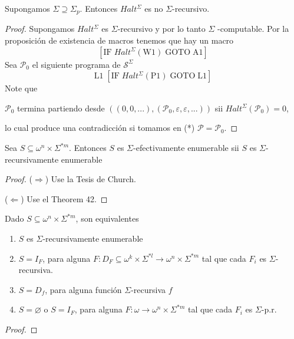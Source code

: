   \begin{lemma}
    Supongamos \(\Sigma \supseteq \Sigma _{p}\). Entonces \( Halt^{\Sigma }\) es no \(\Sigma \)-recursivo.
  \begin{proof}
    Supongamos \(Halt^{\Sigma }\) es \(\Sigma \)-recursivo y por lo tanto \(\Sigma \) -computable. 
    Por la proposición de existencia de macros tenemos que hay un macro
    \[
      \displaystyle \left[ \mathrm{IF}\;Halt^{\Sigma }(\mathrm{W}1)\;\mathrm{GOTO}\;\mathrm{A}1 \right]
    \]
    Sea \(\mathcal{P}_{0}\) el siguiente programa de \(\mathcal{S}^{\Sigma }\)
    \[
      \displaystyle \mathrm{L}1\;\left[ \mathrm{IF}\;Halt^{\Sigma }(\mathrm{P}1)\;\mathrm{GOTO}\; \mathrm{L}1\right]
    \]
    Note que
    
    \(\mathcal{P}_{0}\) termina partiendo desde \(\left( (0,0,...),( \mathcal{P}_{0},\varepsilon ,\varepsilon ,...)
    \right) \) sii \(Halt^{\Sigma }( \mathcal{P}_{0})=0\),

    \noindent lo cual produce una contradicción si tomamos en (*) \(\mathcal{P}= \mathcal{P}_{0}\).
  \end{proof}
  \end{lemma}


  \begin{theorem}
    Sea \(S\subseteq \omega ^{n}\times \Sigma ^{\ast m}\). Entonces \(S\) es \(\Sigma \)-efectivamente enumerable 
    sii \(S\) es \(\Sigma \)-recursivamente enumerable
  \begin{proof}
    (\(\Rightarrow \)) Use la Tesis de Church.

    (\(\Leftarrow \)) Use el Theorem 42.
  \end{proof}
  \end{theorem}

  \begin{theorem} Dado \(S\subseteq \omega ^{n}\times \Sigma ^{\ast m} \), son equivalentes
    \begin{enumerate}
      \item \(S\) es \(\Sigma \)-recursivamente enumerable
      \item \(S=I_{F}\), para alguna \(F:D_{F}\subseteq \omega ^{k}\times \Sigma ^{\ast l}\rightarrow \omega ^{n}\times 
            \Sigma ^{\ast m}\) tal que cada \(F_{i}\) es \(\Sigma \)-recursiva.
      \item \(S=D_{f}\), para alguna función \(\Sigma \)-recursiva \(f\)
      \item \(S=\varnothing \) o \(S=I_{F}\), para alguna \(F:\omega \rightarrow \omega ^{n}\times \Sigma ^{\ast m}\) 
            tal que cada \(F_{i}\) es \(\Sigma \)-p.r.
    \end{enumerate}
  \begin{proof}
  \end{proof}
  \end{theorem}


